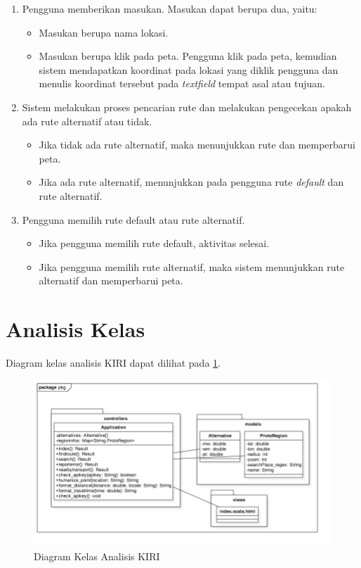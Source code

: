 \begin{enumerate}
	\item Pengguna memberikan masukan. Masukan dapat berupa dua, yaitu:
	\begin{itemize}
		\item Masukan berupa nama lokasi.
		\item Masukan berupa klik pada peta. Pengguna klik pada peta, kemudian sistem mendapatkan koordinat pada lokasi yang diklik pengguna dan menulis koordinat tersebut pada \textit{textfield} tempat asal atau tujuan.
	\end{itemize}
	\item Sistem melakukan proses pencarian rute dan melakukan pengecekan apakah ada rute alternatif atau tidak.
	\begin{itemize}
		\item Jika tidak ada rute alternatif, maka menunjukkan rute dan memperbarui peta.
		\item Jika ada rute alternatif, menunjukkan pada pengguna rute \textit{default} dan rute alternatif.
	\end{itemize}
	\item Pengguna memilih rute default atau rute alternatif.
	\begin{itemize}
		\item Jika pengguna memilih rute default, aktivitas selesai.
		\item Jika pengguna memilih rute alternatif, maka sistem menunjukkan rute alternatif dan memperbarui peta.
	\end{itemize}
\end{enumerate}


\section{Analisis Kelas}
\label{sec:kelasdiagram}
Diagram kelas analisis KIRI dapat dilihat pada \ref{fig:3_classdiagram}.

\begin{figure}[H]
	\centering
	\includegraphics[scale=0.6]{Gambar/Class-Diagram-Analisis}
	\caption{Diagram Kelas Analisis KIRI} 
	\label{fig:3_classdiagram}
\end{figure}


